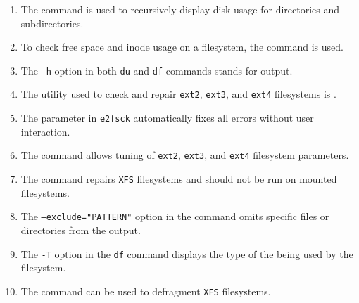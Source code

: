 \documentclass[a4paper]{report}
\begin{document}
\begin{enumerate}[1.]
\item The \underline{\hspace{2cm}} command is used to recursively display disk usage for directories and subdirectories.

\item To check free space and inode usage on a filesystem, the \underline{\hspace{2cm}} command is used.

\item The \texttt{-h} option in both \texttt{du} and \texttt{df} commands stands for \underline{\hspace{2cm}} output.

\item The utility used to check and repair \texttt{ext2}, \texttt{ext3}, and \texttt{ext4} filesystems is \underline{\hspace{2cm}}.

\item The parameter \underline{\hspace{2cm}} in \texttt{e2fsck} automatically fixes all errors without user interaction.

\item The \underline{\hspace{2cm}} command allows tuning of \texttt{ext2}, \texttt{ext3}, and \texttt{ext4} filesystem parameters.

\item The \underline{\hspace{2cm}} command repairs \texttt{XFS} filesystems and should not be run on mounted filesystems.

\item The \texttt{--exclude="PATTERN"} option in the \underline{\hspace{2cm}} command omits specific files or directories from the output.

\item The \texttt{-T} option in the \texttt{df} command displays the type of the \underline{\hspace{2cm}} being used by the filesystem.

\item The \underline{\hspace{2cm}} command can be used to defragment \texttt{XFS} filesystems.
\end{enumerate}

\newpage
\end{document}
